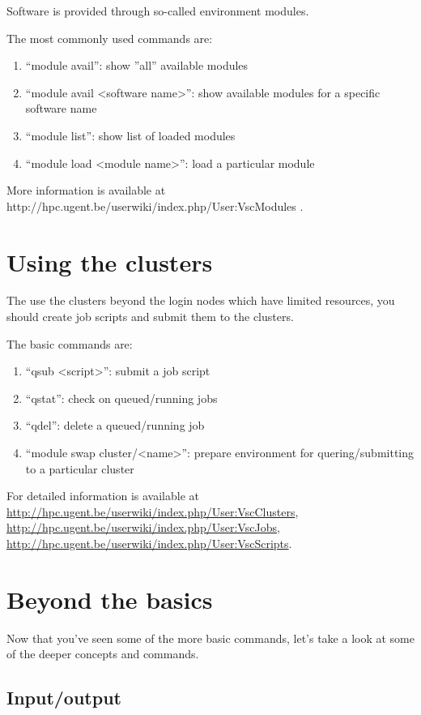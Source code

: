 Software is provided through so-called environment modules.

The most commonly used commands are:

\begin{enumerate}
 \item ``module avail'': show ''all'' available modules
 \item ``module avail <software name>'': show available modules for a specific software name
 \item ``module list'': show list of loaded modules
 \item ``module load <module name>'': load a particular module
\end{enumerate}

More information is available at http://hpc.ugent.be/userwiki/index.php/User:VscModules .

\chapter{Using the clusters}

The use the clusters beyond the login nodes which have limited resources, you should create job scripts and submit them to the clusters.

The basic commands are:

\begin{enumerate}
 \item``qsub <script>'': submit a job script
 \item``qstat'': check on queued/running jobs
 \item``qdel'': delete a queued/running job
 \item``module swap cluster/<name>'': prepare environment for quering/submitting to a particular cluster
\end{enumerate}
For detailed information is available at \url{http://hpc.ugent.be/userwiki/index.php/User:VscClusters}, \url{http://hpc.ugent.be/userwiki/index.php/User:VscJobs}, \url{http://hpc.ugent.be/userwiki/index.php/User:VscScripts}.

\chapter{Beyond the basics}

Now that you've seen some of the more basic commands, let's take a look at some of the deeper concepts and commands. 

\section{Input/output}

